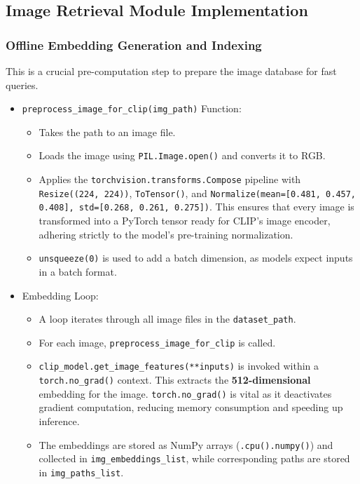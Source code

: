 \documentclass{article}
\begin{document}
\subsection{Image Retrieval Module Implementation}

\subsubsection{Offline Embedding Generation and Indexing}
This is a crucial pre-computation step to prepare the image database for fast queries.
\begin{itemize}
    \item \texttt{preprocess\_image\_for\_clip(img\_path)} Function:
    \begin{itemize}
        \item Takes the path to an image file.
        \item Loads the image using \texttt{PIL.Image.open()} and converts it to RGB.
        \item Applies the \texttt{torchvision.transforms.Compose} pipeline with \texttt{Resize((224, 224))}, \texttt{ToTensor()}, and \texttt{Normalize(mean=[0.481, 0.457, 0.408], std=[0.268, 0.261, 0.275])}. This ensures that every image is transformed into a PyTorch tensor ready for CLIP's image encoder, adhering strictly to the model's pre-training normalization.
        \item \texttt{unsqueeze(0)} is used to add a batch dimension, as models expect inputs in a batch format.
    \end{itemize}
    \item Embedding Loop:
    \begin{itemize}
        \item A loop iterates through all image files in the \texttt{dataset\_path}.
        \item For each image, \texttt{preprocess\_image\_for\_clip} is called.
        \item \texttt{clip\_model.get\_image\_features(**inputs)} is invoked within a \texttt{torch.no\_grad()} context. This extracts the \textbf{512-dimensional} embedding for the image. \texttt{torch.no\_grad()} is vital as it deactivates gradient computation, reducing memory consumption and speeding up inference.
        \item The embeddings are stored as NumPy arrays (\texttt{.cpu().numpy()}) and collected in \texttt{img\_embeddings\_list}, while corresponding paths are stored in \texttt{img\_paths\_list}.
    \end{itemize}

\end{itemize}
\end{document}
